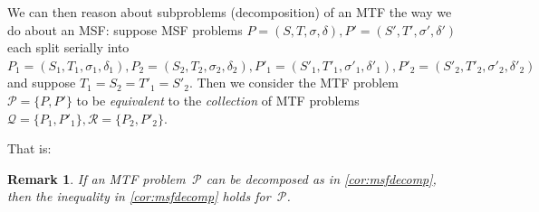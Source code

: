 \documentclass[a4paper, 12p]{article}
\numberwithin{equation}{section}
\newtheorem{remark}[theorem]{Remark}
\begin{document}
We can then reason about subproblems (decomposition) of an MTF the way we do about an MSF: suppose MSF problems $P = (S, T, \sigma, \delta), P' = (S', T', \sigma', \delta')$ each split serially into $P_{1} = (S_{1}, T_{1}, \sigma_{1}, \delta_{1}), P_{2} = (S_{2}, T_{2}, \sigma_{2}, \delta_{2}), P'_{1} = (S'_{1}, T'_{1}, \sigma'_{1}, \delta'_{1}), P'_{2} = (S'_{2}, T'_{2}, \sigma'_{2}, \delta'_{2})$ and suppose $T_{1} = S_{2} = T'_{1} = S'_{2}$. Then we consider the MTF problem $\mathcal{P} = \{P, P'\}$ to be \emph{equivalent} to the \emph{collection} of MTF problems $\mathcal{Q} = \{P_1, P'_1\}, \mathcal{R} = \{P_2, P'_2\}$.

That is:
\begin{remark}
    If an MTF problem~$\mathcal{P}$ can be decomposed as in \cref{cor:msfdecomp}, then the inequality in \cref{cor:msfdecomp} holds for~$\mathcal{P}$.  
    \label{rmk:mtfdecomp}
\end{remark}
\end{document}
